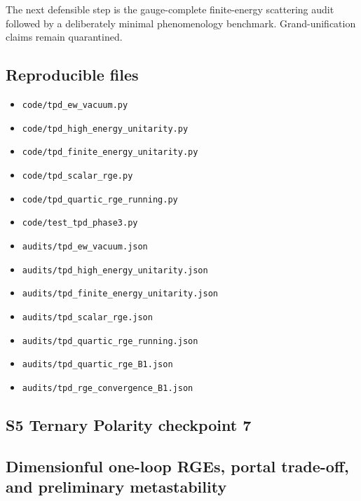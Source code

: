 \documentclass[
]{article}
\providecommand{\tightlist}{%
  \setlength{\itemsep}{0pt}\setlength{\parskip}{0pt}}
\begin{document}
The next defensible step is the gauge-complete finite-energy scattering
audit followed by a deliberately minimal phenomenology benchmark.
Grand-unification claims remain quarantined.

\hypertarget{reproducible-files}{%
\subsection{Reproducible files}\label{reproducible-files}}

\begin{itemize}
\tightlist
\item
  \texttt{code/tpd\_ew\_vacuum.py}
\item
  \texttt{code/tpd\_high\_energy\_unitarity.py}
\item
  \texttt{code/tpd\_finite\_energy\_unitarity.py}
\item
  \texttt{code/tpd\_scalar\_rge.py}
\item
  \texttt{code/tpd\_quartic\_rge\_running.py}
\item
  \texttt{code/test\_tpd\_phase3.py}
\item
  \texttt{audits/tpd\_ew\_vacuum.json}
\item
  \texttt{audits/tpd\_high\_energy\_unitarity.json}
\item
  \texttt{audits/tpd\_finite\_energy\_unitarity.json}
\item
  \texttt{audits/tpd\_scalar\_rge.json}
\item
  \texttt{audits/tpd\_quartic\_rge\_running.json}
\item
  \texttt{audits/tpd\_quartic\_rge\_B1.json}
\item
  \texttt{audits/tpd\_rge\_convergence\_B1.json}
\end{itemize}

\newpage

\hypertarget{s5-ternary-polarity-checkpoint-7}{%
\subsection{S5 Ternary Polarity checkpoint
7}\label{s5-ternary-polarity-checkpoint-7}}

\hypertarget{dimensionful-one-loop-rges-portal-trade-off-and-preliminary-metastability}{%
\subsection{Dimensionful one-loop RGEs, portal trade-off, and
preliminary
metastability}\label{dimensionful-one-loop-rges-portal-trade-off-and-preliminary-metastability}}
\end{document}
